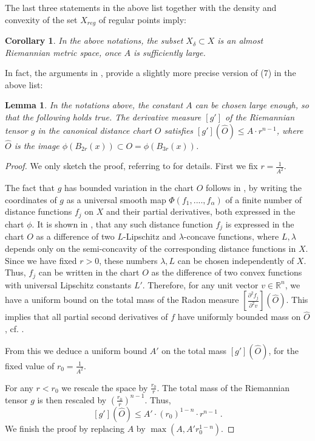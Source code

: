 \documentclass[12pt,leqno]{amsart}
\numberwithin{equation}{section}
\newtheorem{lem}[thm]{Lemma}
\newtheorem{cor}[thm]{Corollary}
\theoremstyle{definition}
\theoremstyle{remark}
\newcommand{\R}{\mathbb{R}}
\begin{document}
  The last three statements in the above list together with the density and convexity of the set $X_{reg}$ of regular points imply:
  \begin{cor}
  In the above notations, the subset $X_{\delta} \subset X$ is an almost Riemannian metric space, once $A$ is sufficiently large.
  \end{cor}



In fact,  the arguments in \cite[4.2]{Per-DC},  provide a slightly more precise version of (7) in the above list:

\begin{lem} \label{lem:A}
In the notations above,  the constant $A$ can be chosen  large enough, so that the following holds true.    The derivative measure $[g']$ of the Riemannian tensor $g$
in the canonical distance chart $O$ satisfies $[g'] (\hat O) \leq A \cdot  r^{n-1} $, where $\hat O$ is the image $\phi (B_{2r} (x)) \subset O=
\phi (B_{3r} (x))$.
\end{lem}

\begin{proof}
We only sketch the proof, referring to \cite{Per-DC} for details. First we fix $r=\frac 1 {A^2}$.

The fact that $g$ has bounded variation in the chart $O$  follows in \cite[Section 4.2]{Per-DC},  by writing the coordinates of $g$
as  a universal  smooth map $\Phi (f_1,....,f_{\alpha})$    of a finite number of distance functions $f_j$  on $X$  and their partial derivatives, both  expressed in the chart $\phi$.
 It is shown in \cite[Section 3]{Per-DC}, that any such distance function $f_j$  is expressed in the chart $O$ as a difference  of two  $L$-Lipschitz and $\lambda$-concave functions,
 where $L,\lambda$ depends only on the semi-concavity of the corresponding distance functions  in $X$. Since we have fixed $r>0$, these numbers $\lambda,L$ can  be chosen independently of $X$.  Thus, $f_j$ can be written in the chart $O$ as the  difference of two convex functions with universal Lipschitz constants $L'$. Therefore, for any unit vector $v\in \R^n$, we have a uniform bound on the total mass of the
 Radon measure $[\frac {\partial ^2 f_j} {\partial ^2v}] (\hat O)$.
 This implies that all partial second derivatives of $f$ have uniformly bounded mass on $\hat O$,
 cf. \cite[Theorem 6.8]{Evans}.

From this we deduce a uniform bound  $A'$ on the total mass $[g'] (\hat O)$, for the fixed value of $r_0=\frac 1 {A^2}$.


For any $r<r_0$ we rescale the space by $\frac {r_0} r$.  The total mass of the Riemannian tensor $g$ is then rescaled
by $(\frac {r_0} r)^{n-1}$.   Thus,  $$[g'] (\hat O) \leq A'\cdot (r_0 ) ^{1-n} \cdot r^{n-1} \; .$$
We finish the proof by replacing $A$ by $\max(A, A' r_0^{1-n})$.
\end{proof}
\end{document}

